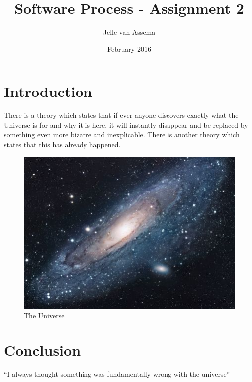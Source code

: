 \documentclass{article}
\title{Software Process - Assignment 2}
\author{Jelle van Assema}
\date{February 2016}
\begin{document}
\maketitle

\section{Introduction}
There is a theory which states that if ever anyone discovers exactly what the Universe is for and why it is here, it will instantly disappear and be replaced by something even more bizarre and inexplicable.
There is another theory which states that this has already happened.

\begin{figure}[h!]
\centering
\includegraphics[scale=1.7]{universe.jpg}
\caption{The Universe}
\label{fig:univerise}
\end{figure}

\section{Conclusion}
``I always thought something was fundamentally wrong with the universe'' \citep[All pages]{adams1995hitchhiker}



\end{document}
